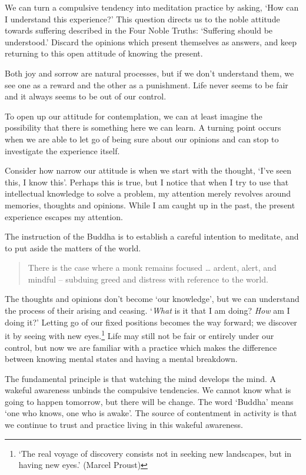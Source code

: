 \noindent We can turn a compulsive tendency into meditation practice by
asking, `How can I understand this experience?' This question directs us
to the noble attitude towards suffering described in the Four Noble
Truths: `Suffering should be understood.' Discard the opinions which
present themselves as answers, and keep returning to this open attitude
of knowing the present.

Both joy and sorrow are natural processes, but if we don't understand
them, we see one as a reward and the other as a punishment. Life never
seems to be fair and it always seems to be out of our control.

To open up our attitude for contemplation, we can at least imagine the
possibility that there is something here we can learn. A turning point
occurs when we are able to let go of being sure about our opinions and
can stop to investigate the experience itself.

Consider how narrow our attitude is when we start with the thought,
`I've seen this, I know this'. Perhaps this is true, but I notice that
when I try to use that intellectual knowledge to solve a problem, my
attention merely revolves around memories, thoughts and opinions. While
I am caught up in the past, the present experience escapes my attention.

The instruction of the Buddha is to establish a careful intention to
meditate, and to put aside the matters of the world.

\clearpage

\begin{quote}
There is the case where a monk remains focused \ldots{} ardent, alert,
and mindful -- subduing greed and distress with reference to the world.

\bigskip

\end{quote}

The thoughts and opinions don't become `our knowledge', but we can
understand the process of their arising and ceasing. `\emph{What} is it
that I am doing? \emph{How} am I doing it?' Letting go of our fixed
positions becomes the way forward; we discover it by seeing with new
eyes.\footnote{`The real voyage of discovery consists not in seeking new
  landscapes, but in having new eyes.' (Marcel Proust)} Life may still
not be fair or entirely under our control, but now we are familiar with
a practice which makes the difference between knowing mental states and
having a mental breakdown.

The fundamental principle is that watching the mind develops the mind. A
wakeful awareness unbinds the compulsive tendencies. We cannot know what
is going to happen tomorrow, but there will be change. The word `Buddha'
means `one who knows, one who is awake'. The source of contentment in
activity is that we continue to trust and practice living in this
wakeful awareness.
